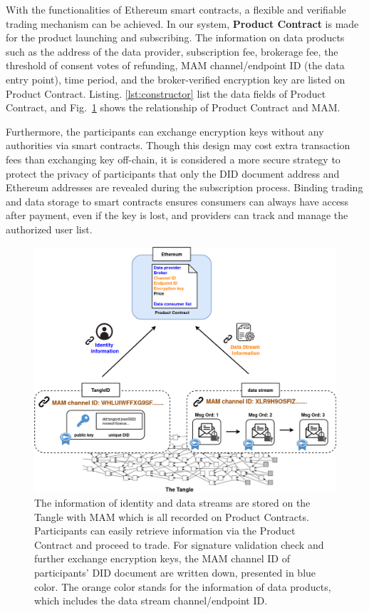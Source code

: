 \begin{spacing}{2.0}
With the functionalities of Ethereum smart contracts, a flexible and verifiable trading mechanism can be achieved. In our system, \textbf{Product Contract} is made for the product launching and subscribing. The information on data products such as the address of the data provider, subscription fee, brokerage fee, the threshold of consent votes of refunding, MAM channel/endpoint ID (the data entry point), time period, and the broker-verified encryption key are listed on Product Contract. Listing. \ref{lst:constructor} list the data fields of Product Contract, and Fig.~\ref{fig:smart_contract_mam} shows the relationship of Product Contract and MAM.

Furthermore, the participants can exchange encryption keys without any authorities via smart contracts. Though this design may cost extra transaction fees than exchanging key off-chain, it is considered a more secure strategy to protect the privacy of participants that only the DID document address and Ethereum addresses are revealed during the subscription process. Binding trading and data storage to smart contracts ensures consumers can always have access after payment, even if the key is lost, and providers can track and manage the authorized user list.

\begin{figure}[h]
    \centering
    \includegraphics[width=5.5in]{img/smart_contract_mam}
    \caption{The information of identity and data streams are stored on the Tangle with MAM which is all recorded on Product Contracts. Participants can easily retrieve information via the Product Contract and proceed to trade. For signature validation check and further exchange encryption keys, the MAM channel ID of participants' DID document are written down, presented in blue color. The orange color stands for the information of data products, which includes the data stream channel/endpoint ID.}
    \label{fig:smart_contract_mam}
\end{figure}
\clearpage


\end{spacing}
